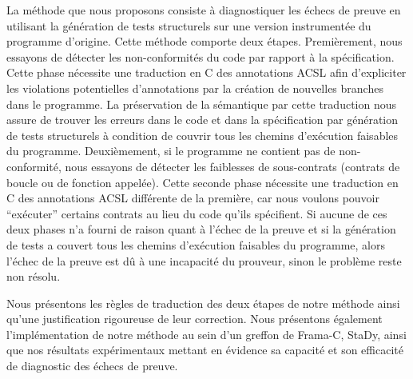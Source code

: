 {  La méthode que nous proposons consiste à diagnostiquer les échecs de preuve en
  utilisant la génération de tests structurels sur une version instrumentée du
  programme d'origine.
  Cette méthode comporte deux étapes.
  Premièrement, nous essayons de détecter les non-conformités du code par
  rapport à la spécification.
  Cette phase nécessite une traduction en C des annotations ACSL afin
  d'expliciter les violations potentielles d'annotations par la création de
  nouvelles branches dans le programme.
  La préservation de la sémantique par cette traduction nous assure de trouver
  les erreurs dans le code et dans la spécification par génération de tests
  structurels à condition de couvrir tous les chemins d'exécution faisables du
  programme.
  Deuxièmement, si le programme ne contient pas de non-conformité, nous essayons
  de détecter les faiblesses de sous-contrats (contrats de boucle ou de fonction
  appelée).
  Cette seconde phase nécessite une traduction en C des annotations ACSL
  différente de la première, car nous voulons pouvoir ``exécuter'' certains
  contrats au lieu du code qu'ils spécifient.
  Si aucune de ces deux phases n'a fourni de raison quant à l'échec de la preuve
  et si la génération de tests a couvert tous les chemins d'exécution faisables
  du programme, alors l'échec de la preuve est dû à une incapacité du prouveur,
  sinon le problème reste non résolu.

  Nous présentons les règles de traduction des deux étapes de notre méthode
  ainsi qu'une justification rigoureuse de leur correction.
  Nous présentons également l'implémentation de notre méthode au sein d'un
  greffon de Frama-C, StaDy, ainsi que nos résultats expérimentaux mettant en
  évidence sa capacité et son efficacité de diagnostic des échecs de preuve.
}

